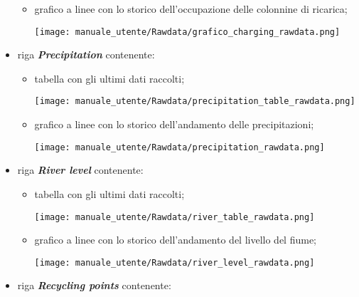\begin{itemize}
\begin{itemize}
        \item grafico a linee con lo storico dell'occupazione delle colonnine di ricarica;
        \begin{center}
            \texttt{[image: manuale\_utente/Rawdata/grafico\_charging\_rawdata.png]}
        \end{center}
    \end{itemize}
    \item riga \textit{\textbf{Precipitation}} contenente:
    \begin{itemize}
        \item tabella con gli ultimi dati raccolti;
        \begin{center}
            \texttt{[image: manuale\_utente/Rawdata/precipitation\_table\_rawdata.png]}
        \end{center}
        \item grafico a linee con lo storico dell'andamento delle precipitazioni;
        \begin{center}
            \texttt{[image: manuale\_utente/Rawdata/precipitation\_rawdata.png]}
        \end{center}
    \end{itemize}
    \item riga \textit{\textbf{River level}} contenente:
    \begin{itemize}
        \item tabella con gli ultimi dati raccolti;
        \begin{center}
            \texttt{[image: manuale\_utente/Rawdata/river\_table\_rawdata.png]}
        \end{center}
        \item grafico a linee con lo storico dell'andamento del livello del fiume;
        \begin{center}
            \texttt{[image: manuale\_utente/Rawdata/river\_level\_rawdata.png]}
        \end{center}
    \end{itemize}
    \item riga \textit{\textbf{Recycling points}} contenente:

\end{itemize}
